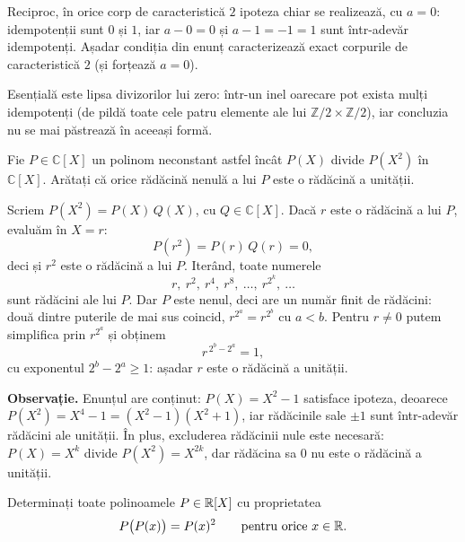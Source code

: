 \begin{obs}
Reciproc, în orice corp de caracteristică $2$ ipoteza chiar se
realizează, cu $a=0$: idempotenții sunt $0$ și $1$, iar
$a-0=0$ și $a-1=-1=1$ sunt într-adevăr idempotenți. Așadar
condiția din enunț caracterizează exact corpurile de
caracteristică $2$ (și forțează $a=0$).

Esențială este lipsa divizorilor lui zero: într-un inel oarecare
pot exista mulți idempotenți (de pildă toate cele patru elemente
ale lui $\mathbb{Z}/2\times\mathbb{Z}/2$), iar concluzia nu se mai
păstrează în aceeași formă.
\end{obs}

\begin{problema}
Fie $P \in \mathbb{C}[X]$ un polinom neconstant astfel încât $P(X)$ divide $P(X^2)$ în $\mathbb{C}[X]$. Arătați că orice rădăcină nenulă a lui $P$ este o rădăcină a unității.
\end{problema}

\begin{solutie}
Scriem $P(X^2) = P(X)\,Q(X)$, cu $Q \in \mathbb{C}[X]$. Dacă $r$ este o rădăcină a lui $P$, evaluăm în $X = r$:
\[
P(r^2) = P(r)\,Q(r) = 0,
\]
deci și $r^2$ este o rădăcină a lui $P$. Iterând, toate numerele
\[
r,\ r^2,\ r^4,\ r^8,\ \ldots,\ r^{2^k},\ \ldots
\]
sunt rădăcini ale lui $P$. Dar $P$ este nenul, deci are un număr finit de rădăcini: două dintre puterile de mai sus coincid, $r^{2^a} = r^{2^b}$ cu $a < b$. Pentru $r \neq 0$ putem simplifica prin $r^{2^a}$ și obținem
\[
r^{\,2^b - 2^a} = 1,
\]
cu exponentul $2^b - 2^a \geq 1$: așadar $r$ este o rădăcină a unității.

\medskip
\noindent\textbf{Observație.} Enunțul are conținut: $P(X) = X^2 - 1$ satisface ipoteza, deoarece $P(X^2) = X^4 - 1 = (X^2 - 1)(X^2 + 1)$, iar rădăcinile sale $\pm 1$ sunt într-adevăr rădăcini ale unității. În plus, excluderea rădăcinii nule este necesară: $P(X) = X^k$ divide $P(X^2) = X^{2k}$, dar rădăcina sa $0$ nu este o rădăcină a unității.
\end{solutie}

\begin{problema}
Determinați toate polinoamele $P \in \mathbb{R}[X]$ cu proprietatea
\[
  P\bigl(P(x)\bigr) = P(x)^2 \qquad \text{pentru orice } x \in \mathbb{R}.
\]
\end{problema}

